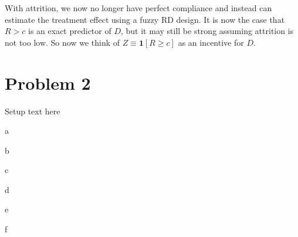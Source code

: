 \documentclass{article}
\begin{document}
\begin{solution}
With attrition, we now no longer have perfect compliance and instead can estimate the treatment effect using a fuzzy RD design. It is now the case that $R>c$ is an exact predictor of $D$, but it may still be strong assuming attrition is not too low. So now we think of $Z\equiv \mathbf{1}[R\geq c]$ as an incentive for $D$.

\end{solution}

\newpage
\section*{Problem 2}
Setup text here

\begin{problem}{a}
\end{problem}
\begin{solution}
\end{solution}

\begin{problem}{b}
\end{problem}
\begin{solution}
\end{solution}

\begin{problem}{c}
\end{problem}
\begin{solution}
\end{solution}

\begin{problem}{d}
\end{problem}
\begin{solution}
\end{solution}

\begin{problem}{e}
\end{problem}
\begin{solution}
\end{solution}

\begin{problem}{f}
\end{problem}
\begin{solution}
\end{solution}
\end{document}
